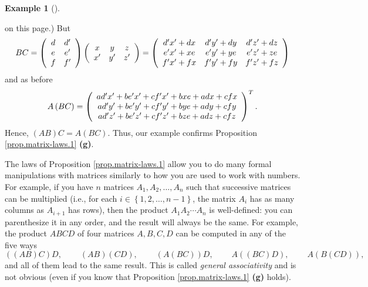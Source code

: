\documentclass[numbers=enddot,12pt,final,onecolumn,notitlepage]{scrartcl}%
\theoremstyle{definition}
\newtheorem{exam}[theo]{Example}
\newenvironment{example}[1][]
{\begin{exam}[#1]\begin{leftbar}}
{\end{leftbar}\end{exam}}
\begin{document}
\begin{example}
on this page.) But
\[
BC=\left(
\begin{array}
[c]{cc}%
d & d^{\prime}\\
e & e^{\prime}\\
f & f^{\prime}%
\end{array}
\right)  \left(
\begin{array}
[c]{ccc}%
x & y & z\\
x^{\prime} & y^{\prime} & z^{\prime}%
\end{array}
\right)  =\left(
\begin{array}
[c]{ccc}%
d^{\prime}x^{\prime}+dx & d^{\prime}y^{\prime}+dy & d^{\prime}z^{\prime}+dz\\
e^{\prime}x^{\prime}+xe & e^{\prime}y^{\prime}+ye & e^{\prime}z^{\prime}+ze\\
f^{\prime}x^{\prime}+fx & f^{\prime}y^{\prime}+fy & f^{\prime}z^{\prime}+fz
\end{array}
\right)
\]
and as before
\[
A\left(  BC\right)  =\left(
\begin{array}
[c]{c}%
ad^{\prime}x^{\prime}+be^{\prime}x^{\prime}+cf^{\prime}x^{\prime
}+bxe+adx+cfx\\
ad^{\prime}y^{\prime}+be^{\prime}y^{\prime}+cf^{\prime}y^{\prime
}+bye+ady+cfy\\
ad^{\prime}z^{\prime}+be^{\prime}z^{\prime}+cf^{\prime}z^{\prime}+bze+adz+cfz
\end{array}
\right)  ^{T}.
\]
Hence, $\left(  AB\right)  C=A\left(  BC\right)  $. Thus, our example confirms
Proposition \ref{prop.matrix-laws.1} \textbf{(g)}.
\end{example}

The laws of Proposition \ref{prop.matrix-laws.1} allow you to do many formal
manipulations with matrices similarly to how you are used to work with
numbers. For example, if you have $n$ matrices $A_{1},A_{2},\ldots,A_{n}$ such
that successive matrices can be multiplied (i.e., for each $i\in\left\{
1,2,\ldots,n-1\right\}  $, the matrix $A_{i}$ has as many columns as $A_{i+1}$
has rows), then the product $A_{1}A_{2}\cdots A_{n}$ is well-defined: you can
parenthesize it in any order, and the result will always be the same. For
example, the product $ABCD$ of four matrices $A,B,C,D$ can be computed in any
of the five ways%
\[
\left(  \left(  AB\right)  C\right)  D,\ \ \ \ \ \ \ \ \ \ \left(  AB\right)
\left(  CD\right)  ,\ \ \ \ \ \ \ \ \ \ \left(  A\left(  BC\right)  \right)
D,\ \ \ \ \ \ \ \ \ \ A\left(  \left(  BC\right)  D\right)
,\ \ \ \ \ \ \ \ \ \ A\left(  B\left(  CD\right)  \right)  ,
\]
and all of them lead to the same result. This is called \textit{general
associativity} and is not obvious (even if you know that Proposition
\ref{prop.matrix-laws.1} \textbf{(g)} holds).
\end{document}
